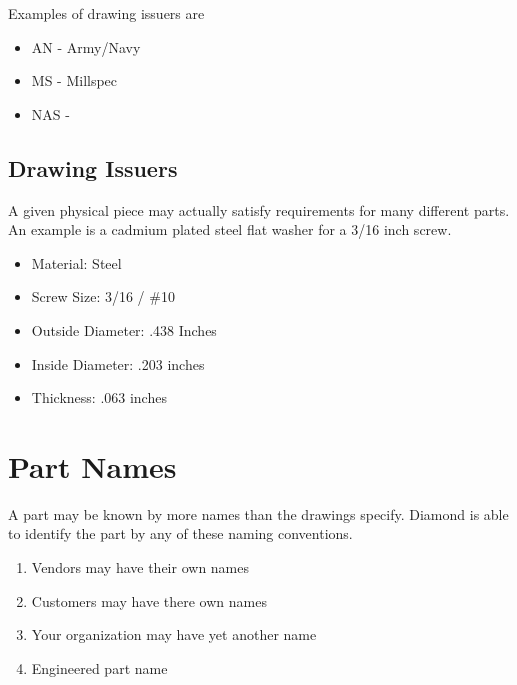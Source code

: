 \documentclass[letterpaper,10pt,english]{sphinxmanual}
\begin{document}
Examples of drawing issuers are
\begin{itemize}
\item {} 
AN - Army/Navy

\item {} 
MS - Millspec

\item {} 
NAS -

\end{itemize}


\subsection{Drawing Issuers}
\label{APS/ApsFeatures:drawing-issuers}
A given physical piece may actually satisfy requirements for many
different parts. An example is a cadmium plated steel flat washer for a
3/16 inch screw.
\begin{itemize}
\item {} 
Material: Steel

\item {} 
Screw Size: 3/16 / \#10

\item {} 
Outside Diameter: .438 Inches

\item {} 
Inside Diameter: .203 inches

\item {} 
Thickness: .063 inches

\end{itemize}


\section{Part Names}
\label{APS/ApsFeatures:part-names}
A part may be known by more names than the drawings specify. Diamond is
able to identify the part by any of these naming conventions.
\begin{enumerate}
\item {} 
Vendors may have their own names

\item {} 
Customers may have there own names

\item {} 
Your organization may have yet another name

\item {} 
Engineered part name

\end{enumerate}
\end{document}

